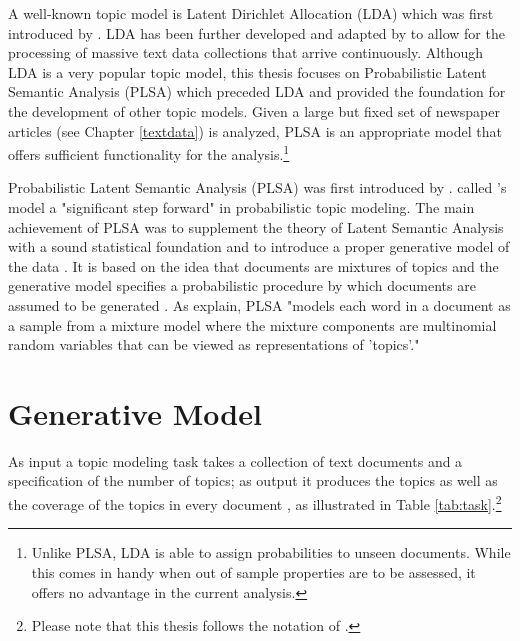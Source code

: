 \documentclass[11pt,a4paper,english,oneside]{book}
\numberwithin{equation}{chapter}
\begin{document}
A well-known topic model is Latent Dirichlet Allocation (LDA) which was first introduced by \cite{Blei.2003}. LDA has been further developed and adapted by \cite{Hoffman2010} to allow for the processing of massive text data collections that arrive continuously. Although LDA is a very popular topic model, this thesis focuses on Probabilistic Latent Semantic Analysis (PLSA) which preceded LDA and provided the foundation for the development of other topic models. Given a large but fixed set of newspaper articles (see Chapter \ref{textdata}) is analyzed, PLSA is an appropriate model that offers sufficient functionality for the analysis.\footnote{Unlike PLSA, LDA is able to assign probabilities to unseen documents. While this comes in handy when out of sample properties are to be assessed, it offers no advantage in the current analysis.}

Probabilistic Latent Semantic Analysis (PLSA) was first introduced by \cite{Hofmann.1999}. \citet[p.~994]{Blei.2003} called \citeauthor{Hofmann.1999}'s model a "significant step forward" in probabilistic topic modeling. The main achievement of PLSA was to supplement the theory of Latent Semantic Analysis with a sound statistical foundation and to introduce a proper generative model of the data \cite[p. 289]{Hofmann.1999}. It is based on the idea that documents are mixtures of topics and the generative model specifies a probabilistic procedure by which documents are assumed to be generated \cite[p.~2]{Steyvers(2007)}. As \citet[p. 994]{Blei.2003} explain, PLSA "models each word in a document as a sample from a mixture model where the mixture components are multinomial random variables that can be viewed as representations of 'topics'."


\section{Generative Model}\label{GM}
As input a topic modeling task takes a collection of text documents and a specification of the number of topics; as output it produces the topics as well as the coverage  of the topics in every document \cite[pp.~330--331]{Zhai.2016}, as illustrated in Table \ref{tab:task}.\footnote{Please note that this thesis follows the notation of \cite{Zhai.2016}.} 
	
\end{document}
